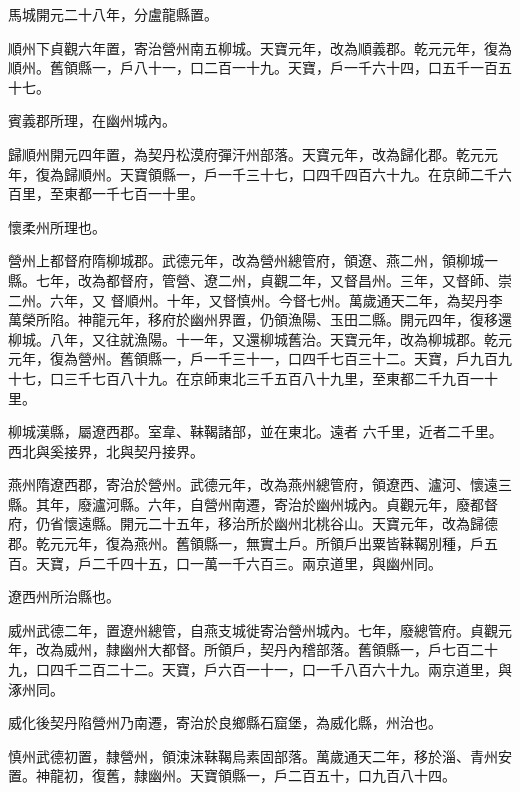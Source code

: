 \begin{pinyinscope}
 馬城開元二十八年，分盧龍縣置。



 順州下貞觀六年置，寄治營州南五柳城。天寶元年，改為順義郡。乾元元年，復為順州。舊領縣一，戶八十一，口二百一十九。天寶，戶一千六十四，口五千一百五十七。



 賓義郡所理，在幽州城內。



 歸順州開元四年置，為契丹松漠府彈汗州部落。天寶元年，改為歸化郡。乾元元年，復為歸順州。天寶領縣一，戶一千三十七，口四千四百六十九。在京師二千六百里，至東都一千七百一十里。



 懷柔州所理也。



 營州上都督府隋柳城郡。武德元年，改為營州總管府，領遼、燕二州，領柳城一縣。七年，改為都督府，管營、遼二州，貞觀二年，又督昌州。三年，又督師、崇二州。六年，又
 督順州。十年，又督慎州。今督七州。萬歲通天二年，為契丹李萬榮所陷。神龍元年，移府於幽州界置，仍領漁陽、玉田二縣。開元四年，復移還柳城。八年，又往就漁陽。十一年，又還柳城舊治。天寶元年，改為柳城郡。乾元元年，復為營州。舊領縣一，戶一千三十一，口四千七百三十二。天寶，戶九百九十七，口三千七百八十九。在京師東北三千五百八十九里，至東都二千九百一十里。



 柳城漢縣，屬遼西郡。室韋、靺鞨諸部，並在東北。遠者
 六千里，近者二千里。西北與奚接界，北與契丹接界。



 燕州隋遼西郡，寄治於營州。武德元年，改為燕州總管府，領遼西、瀘河、懷遠三縣。其年，廢瀘河縣。六年，自營州南遷，寄治於幽州城內。貞觀元年，廢都督府，仍省懷遠縣。開元二十五年，移治所於幽州北桃谷山。天寶元年，改為歸德郡。乾元元年，復為燕州。舊領縣一，無實土戶。所領戶出粟皆靺鞨別種，戶五百。天寶，戶二千四十五，口一萬一千六百三。兩京道里，與幽州同。



 遼西州所治縣也。



 威州武德二年，置遼州總管，自燕支城徙寄治營州城內。七年，廢總管府。貞觀元年，改為威州，隸幽州大都督。所領戶，契丹內稽部落。舊領縣一，戶七百二十九，口四千二百二十二。天寶，戶六百一十一，口一千八百六十九。兩京道里，與涿州同。



 威化後契丹陷營州乃南遷，寄治於良鄉縣石窟堡，為威化縣，州治也。



 慎州武德初置，隸營州，領涑沫靺鞨烏素固部落。萬歲通天二年，移於淄、青州安置。神龍初，復舊，隸幽州。天寶領縣一，戶二百五十，口九百八十四。




\end{pinyinscope}
